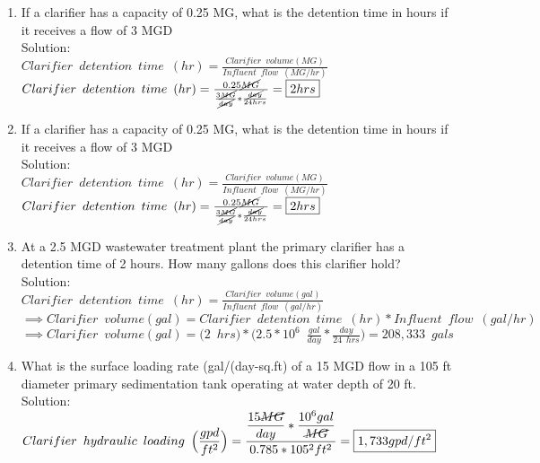 \begin{enumerate}
\item If a clarifier has a capacity of 0.25 MG, what is the detention time in hours if it receives a flow of 3 MGD\\
Solution:\\
$Clarifier \enspace detention \enspace time \enspace (hr) = 	\frac{ Clarifier \enspace volume (MG)}{Influent \enspace flow \enspace (MG/hr)}$\\
\vspace{0.25cm}
$Clarifier \enspace detention \enspace time \enspace (hr) = 	\frac{0.25\cancel{MG}}{\frac{3\cancel{MG}}{\cancel{day}}*\frac{\cancel{day}}{24hrs}}=\boxed{2hrs}$\\

\item If a clarifier has a capacity of 0.25 MG, what is the detention time in hours if it receives a flow of 3 MGD\\
Solution:\\
$Clarifier \enspace detention \enspace time \enspace (hr) = 	\frac{ Clarifier \enspace volume (MG)}{Influent \enspace flow \enspace (MG/hr)}$\\
\vspace{0.25cm}
$Clarifier \enspace detention \enspace time \enspace (hr) = 	\frac{0.25\cancel{MG}}{\frac{3\cancel{MG}}{\cancel{day}}*\frac{\cancel{day}}{24hrs}}=\boxed{2hrs}$\\


\item At a 2.5 MGD wastewater treatment plant the primary clarifier has a detention time of 2 hours. How many gallons does this clarifier hold?\\

Solution:\\
\vspace{0.2cm}
$Clarifier \enspace detention \enspace time \enspace (hr) = 	\frac{ Clarifier \enspace volume (gal)}{Influent \enspace flow \enspace (gal/hr)}$\\
\vspace{0.2cm}
$ \implies Clarifier \enspace volume (gal)=Clarifier \enspace detention \enspace time \enspace (hr)*Influent \enspace flow \enspace (gal/hr)$\\
\vspace{0.2cm}
$ \implies Clarifier \enspace volume (gal)= \Big(2 \enspace hrs\Big)*\Big(2.5*10^6 \enspace \frac{gal}{day}*\frac{day}{24 \enspace hrs}\Big)=\boxed{208,333 \enspace gals}$\\


\item What is the surface loading rate (gal/(day-sq.ft) of a 15 MGD flow in a 105 ft diameter primary sedimentation tank operating at water depth of 20 ft.\\
\vspace{0.25cm}
Solution:\\
\vspace{0.25cm}
$Clarifier \enspace hydraulic \enspace loading \enspace 	\Big(\dfrac{gpd}{ft^2}\Big) =\dfrac{\dfrac{15\cancel{MG}}{{day}}*\dfrac{10^6gal}{\cancel{MG}}}{0.785*105^2 ft^2}=\boxed{1,733gpd/ft^2}$\\


\end{enumerate}
